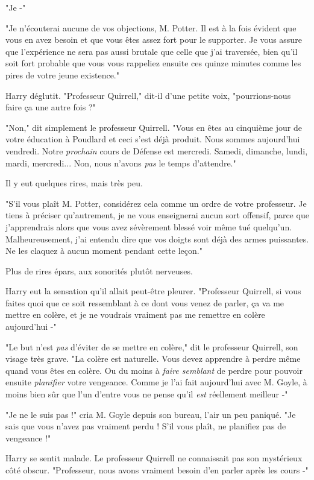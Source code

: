 "Je -"

"Je n'écouterai aucune de vos objections, M. Potter. Il est à la fois évident que vous en avez besoin et que vous êtes assez fort pour le supporter. Je vous assure que l'expérience ne sera pas aussi brutale que celle que j'ai traversée, bien qu'il soit fort probable que vous vous rappeliez ensuite ces quinze minutes comme les pires de votre jeune existence."

Harry déglutit. "Professeur Quirrell," dit-il d'une petite voix, "pourrions-nous faire ça une autre fois ?"

"Non," dit simplement le professeur Quirrell. "Vous en êtes au cinquième jour de votre éducation à Poudlard et ceci s'est déjà produit. Nous sommes aujourd'hui vendredi. Notre \emph{prochain}  cours de Défense est mercredi. Samedi, dimanche, lundi, mardi, mercredi... Non, nous n'avons \emph{pas}  le temps d'attendre."

Il y eut quelques rires, mais très peu.

"S'il vous plaît M. Potter, considérez cela comme un ordre de votre professeur. Je tiens à préciser qu'autrement, je ne vous enseignerai aucun sort offensif, parce que j'apprendrais alors que vous avez sévèrement blessé voir même tué quelqu'un. Malheureusement, j'ai entendu dire que vos doigts sont déjà des armes puissantes. Ne les claquez à aucun moment pendant cette leçon."

Plus de rires épars, aux sonorités plutôt nerveuses.

Harry eut la sensation qu'il allait peut-être pleurer. "Professeur Quirrell, si vous faites quoi que ce soit ressemblant à ce dont vous venez de parler, ça va me mettre en colère, et je ne voudrais vraiment pas me remettre en colère aujourd'hui -"

"Le but n'est \emph{pas}  d'éviter de se mettre en colère," dit le professeur Quirrell, son visage très grave. "La colère est naturelle. Vous devez apprendre à perdre même quand vous êtes en colère. Ou du moins à \emph{faire semblant}  de perdre pour pouvoir ensuite \emph{planifier}  votre vengeance. Comme je l'ai fait aujourd'hui avec M. Goyle, à moins bien sûr que l'un d'entre vous ne pense qu'il \emph{est}  réellement meilleur -"

"Je ne le suis pas !" cria M. Goyle depuis son bureau, l'air un peu paniqué. "Je sais que vous n'avez pas vraiment perdu ! S'il vous plaît, ne planifiez pas de vengeance !"

Harry se sentit malade. Le professeur Quirrell ne connaissait pas son mystérieux côté obscur. "Professeur, nous avons vraiment besoin d'en parler après les cours -"

